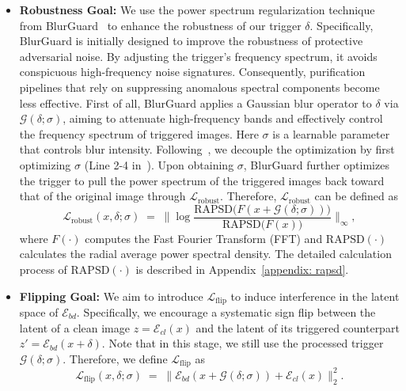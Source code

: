 \documentclass[letterpaper,twocolumn,10pt]{article}
\begin{document}
\begin{itemize}

\item \textbf{Robustness Goal:}
We use the power spectrum regularization technique from BlurGuard~\cite{kim2026blurguard} to enhance the robustness of our trigger $\delta$.
Specifically, BlurGuard is initially designed to improve the robustness of protective adversarial noise.
By adjusting the trigger's frequency spectrum, it avoids conspicuous high-frequency noise signatures.
Consequently, purification pipelines that rely on suppressing anomalous spectral components become less effective.
First of all, BlurGuard applies a Gaussian blur operator to $\delta$ via $\mathcal{G}(\delta;\sigma)$, aiming to attenuate high-frequency bands and effectively control the frequency spectrum of triggered images.
Here $\sigma$ is a learnable parameter that controls blur intensity.
Following~\cite{kim2026blurguard}, we decouple the optimization by first optimizing $\sigma$ (Line 2-4 in~).
Upon obtaining $\sigma$, BlurGuard further optimizes the trigger to pull the power spectrum of the triggered images back toward that of the original image through $\mathcal{L}_{\mathrm{robust}}$.
Therefore, $\mathcal{L}_{\mathrm{robust}}$ can be defined as
\begin{equation*}
\mathcal{L}_{\mathrm{robust}}(x,\delta;\sigma)
\;=\;
\Big\|
\log \frac{\mathrm{RAPSD}\!\big(F(x+\mathcal{G}(\delta;\sigma))\big)}{\mathrm{RAPSD}\!\big(F(x)\big)}
\Big\|_{\infty},
\label{eq:stage1_lrobust}
\end{equation*}
where $F(\cdot)$ computes the Fast Fourier Transform (FFT) and $\mathrm{RAPSD}(\cdot)$ calculates the radial average power spectral density.
The detailed calculation process of $\mathrm{RAPSD}(\cdot)$ is described in Appendix~\ref{appendix: rapsd}.

\item \textbf{Flipping Goal:}
We aim to introduce $\mathcal{L}_{\mathrm{flip}}$ to induce interference in the latent space of $\mathcal{E}_{bd}$.
Specifically, we encourage a systematic sign flip between the latent of a clean image $z=\mathcal{E}_{cl}(x)$ and the latent of its triggered counterpart $z'=\mathcal{E}_{bd}(x+\delta)$.
Note that in this stage, we still use the processed trigger $\mathcal{G}(\delta;\sigma)$.
Therefore, we define $\mathcal{L}_{\mathrm{flip}}$ as
\begin{equation*}
\label{eq:stage1_lflip}
\mathcal{L}_{\mathrm{flip}}(x,\delta;\sigma)
\;=\;
\big\|
\mathcal{E}_{bd}(x+\mathcal{G}(\delta;\sigma)) + \mathcal{E}_{cl}(x)
\big\|_2^2.
\end{equation*}


\end{itemize}
\end{document}
